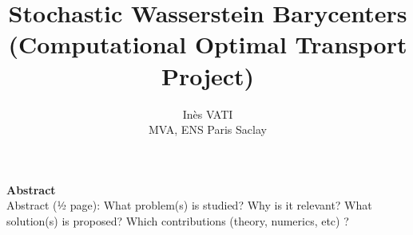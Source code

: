 \documentclass[a4paper, 11pt]{article}
\title{Stochastic Wasserstein Barycenters (Computational Optimal Transport Project)}
\author{Inès VATI \email{ines.vati@eleves.enpc.fr} \\ MVA, ENS Paris Saclay }
\begin{document}
\maketitle

\begin{center}
    \textbf{Abstract} \\
     
Abstract (½ page): 
What problem(s) is studied? 
Why is it relevant? 
What solution(s) is proposed? 
Which contributions (theory, numerics, etc) ? 
\end{center}
\newpage





 





\printbibliography
\end{document}
